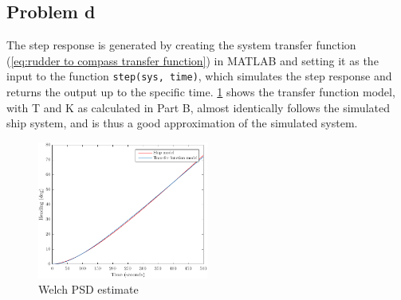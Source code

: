 \subsection{Problem d}
The step response is generated by creating the system transfer function (\cref{eq:rudder to compass transfer function}) in MATLAB and setting it as the input to the function {\texttt{step(sys, time)}}, which simulates the step response and returns the output up to the specific time. \cref{fig:1d-riktig_amplitude} shows the transfer function model, with T and K as calculated in Part B, almost identically follows the simulated ship system, and is thus a good approximation of the simulated system.



\begin{figure}[h]
    \centering
    \includegraphics[width=0.5\textwidth]{images/1d-riktig_amplitude}
    \caption{Welch PSD estimate}
    \label{fig:1d-riktig_amplitude}
\end{figure}
